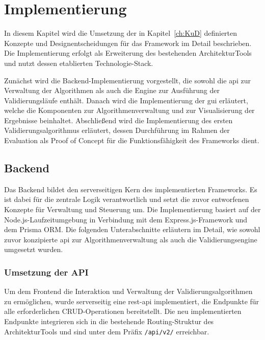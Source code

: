 

\chapter{Implementierung}
\label{ch:imp}

In diesem Kapitel wird die Umsetzung der in Kapitel~\ref{ch:KuD} definierten Konzepte und Designentscheidungen für das Framework im Detail beschrieben. Die Implementierung erfolgt als Erweiterung des bestehenden ArchitekturTools und nutzt dessen etablierten Technologie-Stack.

Zunächst wird die Backend-Implementierung vorgestellt, die sowohl die \gls{api} zur Verwaltung der Algorithmen als auch die Engine zur Ausführung der Validierungsläufe enthält. Danach wird die Implementierung der \gls{gui} erläutert, welche die Komponenten zur Algorithmenverwaltung und zur Visualisierung der Ergebnisse beinhaltet. Abschließend wird die Implementierung des ersten Validierungsalgorithmus erläutert, dessen Durchführung im Rahmen der Evaluation als Proof of Concept für die Funktionsfähigkeit des Frameworks dient.

\section{Backend}
\label{sec:backendimp}

Das Backend bildet den serverseitigen Kern des implementierten Frameworks. Es ist dabei für die zentrale Logik verantwortlich und setzt die zuvor entworfenen Konzepte für  Verwaltung und Steuerung um. Die Implementierung basiert auf der Node.js-Laufzeitumgebung in Verbindung mit dem Express.js-Framework und dem Prisma ORM. Die folgenden Unterabschnitte erläutern im Detail, wie sowohl zuvor konzipierte \gls{api} zur Algorithmenverwaltung als auch die Validierungsengine umgesetzt wurden.

\subsection{Umsetzung der API}
\label{subsec:api}

Um dem Frontend die Interaktion und Verwaltung der Validierungsalgorithmen zu ermöglichen, wurde serverseitig eine \gls{rest}-\gls{api} implementiert, die Endpunkte für alle erforderlichen CRUD-Operationen bereitstellt. Die neu implementierten Endpunkte integrieren sich in die bestehende Routing-Struktur des ArchitekturTools und sind unter dem Präfix \texttt{/api/v2/} erreichbar.


